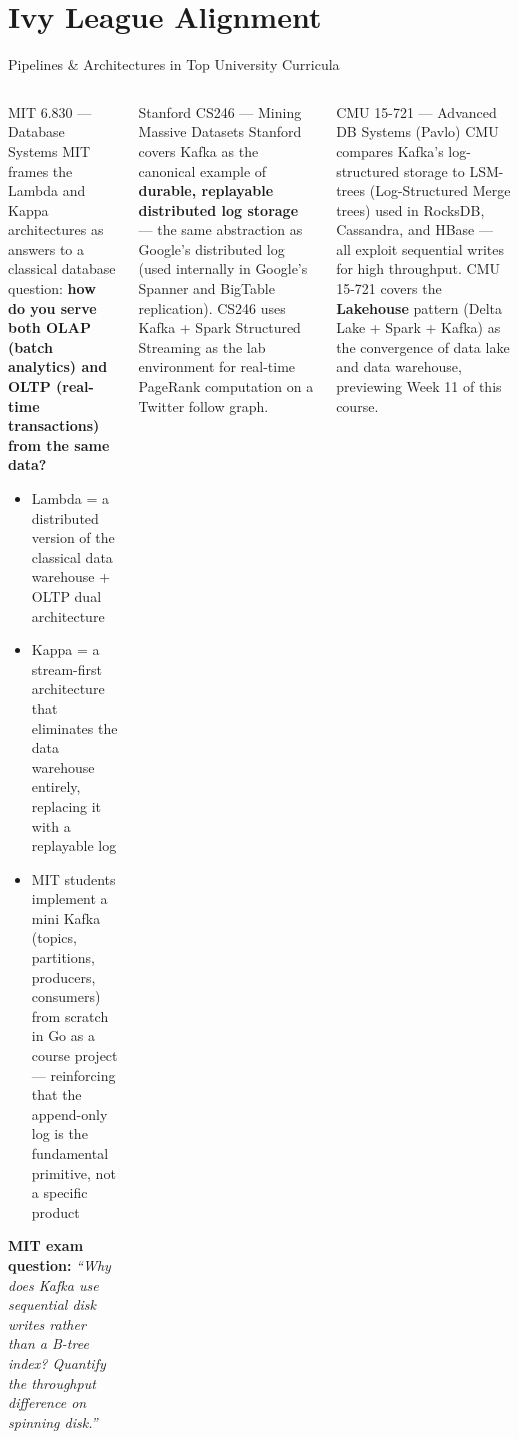 \documentclass[aspectratio=169,10pt]{beamer}
\begin{document}
\section{Ivy League Alignment}

\begin{frame}{Pipelines \& Architectures in Top University Curricula}
  \begin{columns}[T]
      \begin{block}{MIT 6.830 — Database Systems}
        \small MIT frames the Lambda and Kappa architectures as answers to a classical database question: \textbf{how do you serve both OLAP (batch analytics) and OLTP (real-time transactions) from the same data?}
        \begin{itemize}
          \item Lambda = a distributed version of the classical data warehouse + OLTP dual architecture
          \item Kappa = a stream-first architecture that eliminates the data warehouse entirely, replacing it with a replayable log
          \item MIT students implement a mini Kafka (topics, partitions, producers, consumers) from scratch in Go as a course project — reinforcing that the append-only log is the fundamental primitive, not a specific product
        \end{itemize}
        \textbf{MIT exam question:} \textit{``Why does Kafka use sequential disk writes rather than a B-tree index?  Quantify the throughput difference on spinning disk.''}
      \end{block}

      \begin{exampleblock}{Stanford CS246 — Mining Massive Datasets}
        \small Stanford covers Kafka as the canonical example of \textbf{durable, replayable distributed log storage} — the same abstraction as Google's distributed log (used internally in Google's Spanner and BigTable replication).  CS246 uses Kafka + Spark Structured Streaming as the lab environment for real-time PageRank computation on a Twitter follow graph.
      \end{exampleblock}
      \vspace{4pt}
      \begin{alertblock}{CMU 15-721 — Advanced DB Systems (Pavlo)}
        \small CMU compares Kafka's log-structured storage to LSM-trees (Log-Structured Merge trees) used in RocksDB, Cassandra, and HBase --- all exploit sequential writes for high throughput.  CMU 15-721 covers the \textbf{Lakehouse} pattern (Delta Lake + Spark + Kafka) as the convergence of data lake and data warehouse, previewing Week 11 of this course.
      \end{alertblock}
  \end{columns}
\end{frame}
\end{document}
